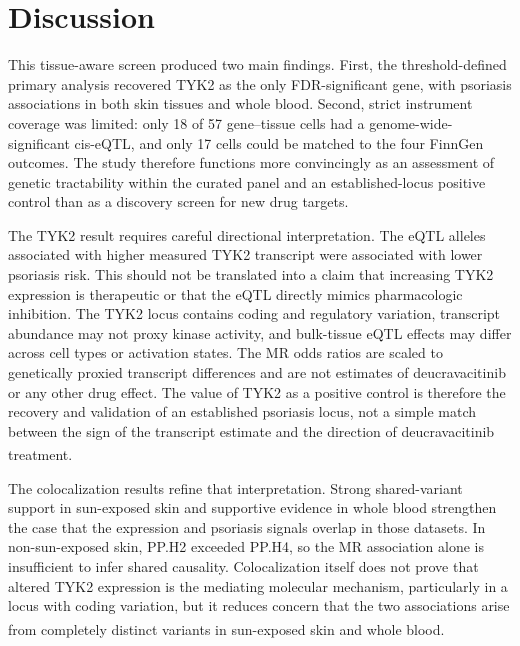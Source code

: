 \section*{Discussion}

This tissue-aware screen produced two main findings. First, the threshold-defined primary analysis recovered TYK2 as the only FDR-significant gene, with psoriasis associations in both skin tissues and whole blood. Second, strict instrument coverage was limited: only 18 of 57 gene--tissue cells had a genome-wide-significant cis-eQTL, and only 17 cells could be matched to the four FinnGen outcomes. The study therefore functions more convincingly as an assessment of genetic tractability within the curated panel and an established-locus positive control than as a discovery screen for new drug targets.

The TYK2 result requires careful directional interpretation. The eQTL alleles associated with higher measured TYK2 transcript were associated with lower psoriasis risk. This should not be translated into a claim that increasing TYK2 expression is therapeutic or that the eQTL directly mimics pharmacologic inhibition. The TYK2 locus contains coding and regulatory variation, transcript abundance may not proxy kinase activity, and bulk-tissue eQTL effects may differ across cell types or activation states. The MR odds ratios are scaled to genetically proxied transcript differences and are not estimates of deucravacitinib or any other drug effect. The value of TYK2 as a positive control is therefore the recovery and validation of an established psoriasis locus, not a simple match between the sign of the transcript estimate and the direction of deucravacitinib treatment.\textsuperscript{\cite{steri2025tyk2,armstrong2023deucravacitinib}}

The colocalization results refine that interpretation. Strong shared-variant support in sun-exposed skin and supportive evidence in whole blood strengthen the case that the expression and psoriasis signals overlap in those datasets. In non-sun-exposed skin, PP.H2 exceeded PP.H4, so the MR association alone is insufficient to infer shared causality. Colocalization itself does not prove that altered TYK2 expression is the mediating molecular mechanism, particularly in a locus with coding variation, but it reduces concern that the two associations arise from completely distinct variants in sun-exposed skin and whole blood.\textsuperscript{\cite{giambartolomei2014coloc,zuber2022coloc}}

